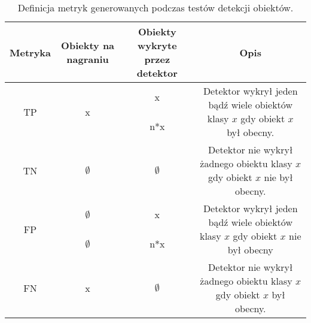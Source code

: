 \begin{table}[H]
    \centering
    \caption{Definicja metryk generowanych podczas testów detekcji obiektów.}
    \begin{tabular}{|c|c|c|c|}
    \hline
    Metryka & Obiekty na nagraniu & Obiekty wykryte przez detektor & Opis \\ \hline


    \multirow{2}{*}{TP} & \multirow{2}{*}{x} & x & \multirow{2}{*}{Detektor wykrył jeden bądź wiele obiektów klasy $x$ gdy obiekt $x$ był obecny.} \\ \cline{3-3}
    & & n*x & \\ \hline

    TN & $\emptyset$ & $\emptyset$ & Detektor nie wykrył żadnego obiektu klasy $x$ gdy obiekt $x$ nie był obecny. \\ \hline

    \multirow{2}{*}{FP} & $\emptyset$ & x & \multirow{2}{*}{Detektor wykrył jeden bądź wiele obiektów klasy $x$ gdy obiekt $x$ nie był obecny} \\ \cline{2-3}
    & $\emptyset$ & n*x & \\ \hline

    FN & x & $\emptyset$ & Detektor nie wykrył żadnego obiektu klasy $x$ gdy obiekt $x$ był obecny. \\ \hline
    
    \end{tabular}
\end{table}